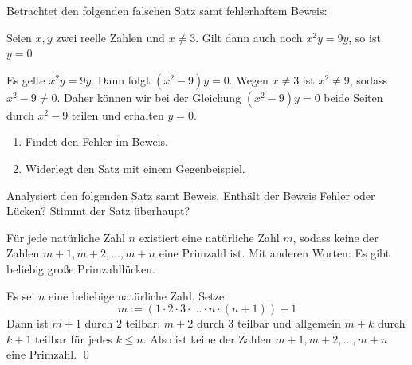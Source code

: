\begin{aufg}[Fehlersuche I]
    Betrachtet den folgenden falschen Satz samt fehlerhaftem Beweis:
    \begin{satz}
        Seien $x,y$ zwei reelle Zahlen und $x\neq 3$. Gilt dann auch noch $x^2y=9y$, so ist $y=0$
    \end{satz}
    \begin{bew}
        Es gelte $x^2y=9y$. Dann folgt $(x^2-9)y=0$. Wegen $x\neq 3$ ist $x^2\neq 9$, sodass $x^2-9\neq 0$. Daher können wir bei der Gleichung $(x^2-9)y=0$ beide Seiten durch $x^2-9$ teilen und erhalten $y=0$.
    \end{bew}
    \begin{enumerate}
        \item Findet den Fehler im Beweis.
        \item Widerlegt den Satz mit einem Gegenbeispiel.
    \end{enumerate}
\end{aufg}


\begin{aufg}[Fehlersuche II]
    Analysiert den folgenden Satz samt Beweis. Enthält der Beweis Fehler oder Lücken? Stimmt der Satz überhaupt?
    \begin{satz}
        Für jede natürliche Zahl $n$ existiert eine natürliche Zahl $m$, sodass keine der Zahlen $m+1,m+2,\dots , m+n$ eine Primzahl ist. Mit anderen Worten: Es gibt beliebig große Primzahllücken. 
    \end{satz}
    \begin{bew}
        Es sei $n$ eine beliebige natürliche Zahl. Setze 
            \[ m:= (1 \cdot 2 \cdot 3 \cdot \ldots \cdot n \cdot(n+1)) +1 \]
        Dann ist $m+1$ durch $2$ teilbar, $m+2$ durch $3$ teilbar und allgemein $m+k$ durch $k+1$ teilbar für jedes $k\le n$. Also ist keine der Zahlen $m+1,m+2,\dots , m+n$ eine Primzahl. \qed
    \end{bew}
\end{aufg}


